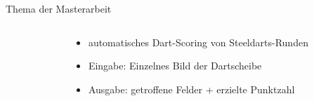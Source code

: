 \begin{frame}{Thema der Masterarbeit}
\begin{columns}
\begin{column}{0.4\linewidth}
        \end{column}
        \begin{column}{0.6\linewidth}

            \begin{itemize}
                \item automatisches Dart-Scoring von Steeldarts-Runden
                \item Eingabe: Einzelnes Bild der Dartscheibe
                \item Ausgabe: getroffene Felder + erzielte Punktzahl
            \end{itemize}

        \end{column}
    \end{columns}
\end{frame}

